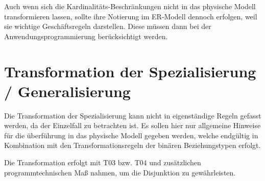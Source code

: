           Auch wenn sich die Kardinalitäts-Beschränkungen nicht in das physische Modell transformieren lassen, sollte ihre Notierung im ER-Modell dennoch erfolgen, weil sie wichtige Geschäftsregeln darstellen. Diese müssen dann bei der Anwendungsprogrammierung berück\-sichtigt werden.
    \section{Transformation der Spezialisierung / Generalisierung}
      Die Transformation der Spezialisierung kann nicht in eigenständige Regeln gefasst werden, da der Einzelfall zu betrachten ist. Es sollen hier nur allgemeine Hinweise für die überführung in das physische Modell gegeben werden, welche endgültig in Kombination mit den Transformationsregeln der binären Beziehungstypen erfolgt.
      \begin{center}
      \end{center}
      \begin{center}
      \end{center}
      Die Transformation erfolgt mit T03 bzw. T04 und zusätzlichen programmtechnischen Maß nahmen, um die Disjunktion zu gewährleisten.
